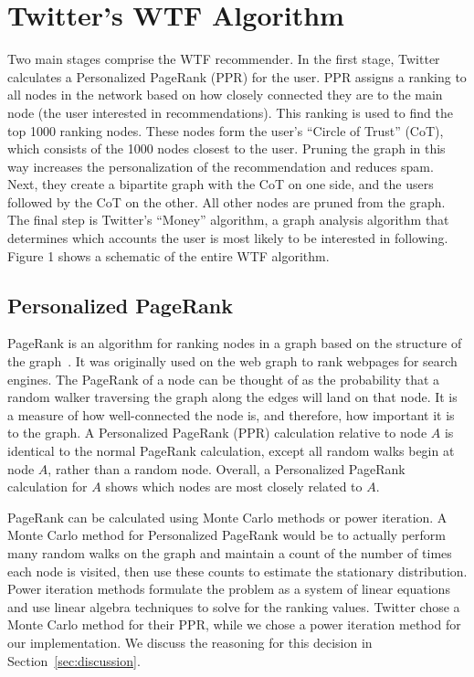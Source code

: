 \documentclass{article}
\renewcommand{\cite}[1]{}
\begin{document}
\section{Twitter's WTF Algorithm}

Two main stages comprise the WTF recommender. In the first stage, Twitter calculates a Personalized PageRank (PPR) for the user. PPR assigns a ranking to all nodes in the network based on how closely connected they are to the main node (the user interested in recommendations). This ranking is used to find the top 1000 ranking nodes. These nodes form the user's ``Circle of Trust'' (CoT), which consists of the 1000 nodes closest to the user. Pruning the graph in this way increases the personalization of the recommendation and reduces spam. Next, they create a bipartite graph with the CoT on one side, and the users followed by the CoT on the other. All other nodes are pruned from the graph. The final step is Twitter's ``Money'' algorithm, a graph analysis algorithm that determines which accounts the user is most likely to be interested in following. Figure 1 shows a schematic of the entire WTF algorithm.

\subsection{Personalized PageRank}
PageRank is an algorithm for ranking nodes in a graph based on the structure of the graph~\cite{Page:1999:TPC}. It was originally used on the web graph to rank webpages for search engines. The PageRank of a node can be thought of as the probability that a random walker traversing the graph along the edges will land on that node. It is a measure of how well-connected the node is, and therefore, how important it is to the graph. A Personalized PageRank (PPR) calculation relative to node $A$ is identical to the normal PageRank calculation, except all random walks begin at node $A$, rather than a random node. Overall, a Personalized PageRank calculation for $A$ shows which nodes are most closely related to $A$\@.

PageRank can be calculated using Monte Carlo methods or power iteration. A Monte Carlo method for Personalized PageRank would be to actually perform many random walks on the graph and maintain a count of the number of times each node is visited, then use these counts to estimate the stationary distribution. Power iteration methods formulate the problem as a system of linear equations and use linear algebra techniques to solve for the ranking values. Twitter chose a Monte Carlo method for their PPR, while we chose a power iteration method for our implementation. We discuss the reasoning for this decision in Section~\ref{sec:discussion}.
\end{document}
